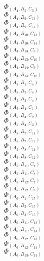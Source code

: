 \documentclass[14pt]{article}
\begin{document}
    $\Phi_{({A}_{4}, {B}_{5}, {C}_{3})}$ \\ 
    $\Phi_{({A}_{4}, {B}_{9}, {C}_{13})}$ \\ 
    $\Phi_{({A}_{4}, {B}_{9}, {C}_{14})}$ \\ 
    $\Phi_{({A}_{4}, {B}_{10}, {C}_{13})}$ \\ 
    $\Phi_{({A}_{4}, {B}_{10}, {C}_{14})}$ \\ 
    $\Phi_{({A}_{4}, {B}_{13}, {C}_{9})}$ \\ 
    $\Phi_{({A}_{4}, {B}_{13}, {C}_{10})}$ \\ 
    $\Phi_{({A}_{4}, {B}_{14}, {C}_{9})}$ \\ 
    $\Phi_{({A}_{4}, {B}_{14}, {C}_{10})}$ \\ 
    $\Phi_{({A}_{5}, {B}_{1}, {C}_{4})}$ \\ 
    $\Phi_{({A}_{5}, {B}_{2}, {C}_{4})}$ \\ 
    $\Phi_{({A}_{5}, {B}_{3}, {C}_{4})}$ \\ 
    $\Phi_{({A}_{5}, {B}_{4}, {C}_{1})}$ \\ 
    $\Phi_{({A}_{5}, {B}_{4}, {C}_{2})}$ \\ 
    $\Phi_{({A}_{5}, {B}_{4}, {C}_{3})}$ \\ 
    $\Phi_{({A}_{5}, {B}_{7}, {C}_{11})}$ \\ 
    $\Phi_{({A}_{5}, {B}_{7}, {C}_{12})}$ \\ 
    $\Phi_{({A}_{5}, {B}_{8}, {C}_{11})}$ \\ 
    $\Phi_{({A}_{5}, {B}_{8}, {C}_{12})}$ \\ 
    $\Phi_{({A}_{5}, {B}_{11}, {C}_{7})}$ \\ 
    $\Phi_{({A}_{5}, {B}_{11}, {C}_{8})}$ \\ 
    $\Phi_{({A}_{5}, {B}_{12}, {C}_{7})}$ \\ 
    $\Phi_{({A}_{5}, {B}_{12}, {C}_{8})}$ \\ 
    $\Phi_{({A}_{6}, {B}_{1}, {C}_{15})}$ \\ 
    $\Phi_{({A}_{6}, {B}_{2}, {C}_{15})}$ \\ 
    $\Phi_{({A}_{6}, {B}_{3}, {C}_{15})}$ \\ 
    $\Phi_{({A}_{6}, {B}_{11}, {C}_{13})}$ \\ 
    $\Phi_{({A}_{6}, {B}_{11}, {C}_{14})}$ \\ 
    $\Phi_{({A}_{6}, {B}_{12}, {C}_{13})}$ \\ 
    $\Phi_{({A}_{6}, {B}_{12}, {C}_{14})}$ \\ 
    $\Phi_{({A}_{6}, {B}_{13}, {C}_{11})}$ \\ 
\end{document}
